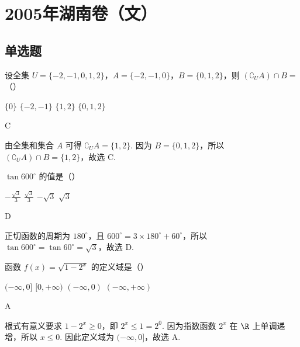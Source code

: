 \chapter{2005年湖南卷（文）}
\section{单选题}
\begin{problem}
设全集 \(U = \{-2, -1, 0, 1, 2\}\)，\(A = \{-2, -1, 0\}\)，\(B = \{0, 1, 2\}\)，则 \((\complement_U A) \cap B =\)（\quad）

\choices
    {\( \{0\} \)}
    {\(\{-2, -1\}\)}
    {\(\{1, 2\}\)}
    {\(\{0, 1, 2\}\)}
\end{problem}

\begin{answer}
C
\end{answer}

\begin{solution}
由全集和集合 \(A\) 可得 \(\complement_U A=\{1,2\}\). 因为 \(B=\{0,1,2\}\)，所以 \((\complement_U A)\cap B=\{1,2\}\)，故选 C.
\end{solution}

\begin{problem}
\(\tan 600^{\circ}\) 的值是（\quad）

\choices
    {\(-\frac{\sqrt{3}}{3}\)}
    {\(\frac{\sqrt{3}}{3}\)}
    {\(-\sqrt{3}\)}
    {\(\sqrt{3}\)}
\end{problem}

\begin{answer}
D
\end{answer}

\begin{solution}
正切函数的周期为 \(180^{\circ}\)，且 \(600^{\circ}=3\times180^{\circ}+60^{\circ}\)，所以 \(\tan600^{\circ}=\tan60^{\circ}=\sqrt{3}\)，故选 D.
\end{solution}

\begin{problem}
函数 \( f(x) = \sqrt{1 - 2^x} \) 的定义域是（\quad）

\choices
    {\((- \infty, 0]\)}
    {\([0, +\infty)\)}
    {\((-\infty, 0)\)}
    {\((-\infty, +\infty)\)}
\end{problem}

\begin{answer}
A
\end{answer}

\begin{solution}
根式有意义要求 \(1-2^x\geqslant0\)，即 \(2^x\leqslant1=2^0\). 因为指数函数 \(2^x\) 在 \(\R\) 上单调递增，所以 \(x\leqslant0\). 因此定义域为 \((-\infty,0]\)，故选 A.
\end{solution}

